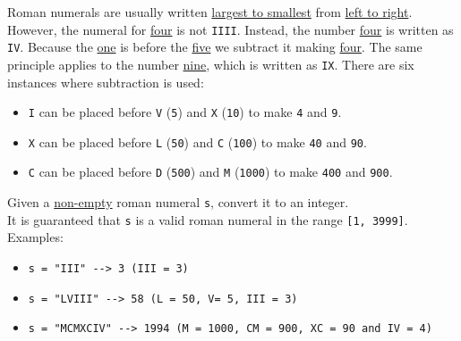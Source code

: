 Roman numerals are usually written \ul{largest to smallest} from \ul{left to right}. However, the numeral for \ul{four} is not {\colorbox{CodeBackground}{\lstinline|IIII|}}. Instead, the number \ul{four} is written as {\colorbox{CodeBackground}{\lstinline|IV|}}. Because the \ul{one} is before the \ul{five} we subtract it making \ul{four}. The same principle applies to the number \ul{nine}, which is written as {\colorbox{CodeBackground}{\lstinline|IX|}}. There are six instances where subtraction is used:
\begin{itemize}
\item {\colorbox{CodeBackground}{\lstinline|I|}} can be placed before {\colorbox{CodeBackground}{\lstinline|V|}} ({\colorbox{CodeBackground}{\lstinline|5|}}) and {\colorbox{CodeBackground}{\lstinline|X|}} ({\colorbox{CodeBackground}{\lstinline|10|}}) to make {\colorbox{CodeBackground}{\lstinline|4|}} and {\colorbox{CodeBackground}{\lstinline|9|}}. 
\item {\colorbox{CodeBackground}{\lstinline|X|}} can be placed before {\colorbox{CodeBackground}{\lstinline|L|}} ({\colorbox{CodeBackground}{\lstinline|50|}}) and {\colorbox{CodeBackground}{\lstinline|C|}} ({\colorbox{CodeBackground}{\lstinline|100|}}) to make {\colorbox{CodeBackground}{\lstinline|40|}} and {\colorbox{CodeBackground}{\lstinline|90|}}. 
\item {\colorbox{CodeBackground}{\lstinline|C|}} can be placed before {\colorbox{CodeBackground}{\lstinline|D|}} ({\colorbox{CodeBackground}{\lstinline|500|}}) and {\colorbox{CodeBackground}{\lstinline|M|}} ({\colorbox{CodeBackground}{\lstinline|1000|}}) to make {\colorbox{CodeBackground}{\lstinline|400|}} and {\colorbox{CodeBackground}{\lstinline|900|}}.
\end{itemize}

Given a \ul{non-empty} roman numeral {\colorbox{CodeBackground}{\lstinline|s|}}, convert it to an integer.\\

It is guaranteed that {\colorbox{CodeBackground}{\lstinline|s|}} is a valid roman numeral in the range {\colorbox{CodeBackground}{\lstinline|[1, 3999]|}}.\\

Examples:
\begin{itemize}
\item {\colorbox{CodeBackground}{\lstinline|s = "III" --> 3 (III = 3)|}}
\item {\colorbox{CodeBackground}{\lstinline|s = "LVIII" --> 58 (L = 50, V= 5, III = 3)|}}
\item {\colorbox{CodeBackground}{\lstinline|s = "MCMXCIV" --> 1994 (M = 1000, CM = 900, XC = 90 and IV = 4)|}}
\end{itemize}

